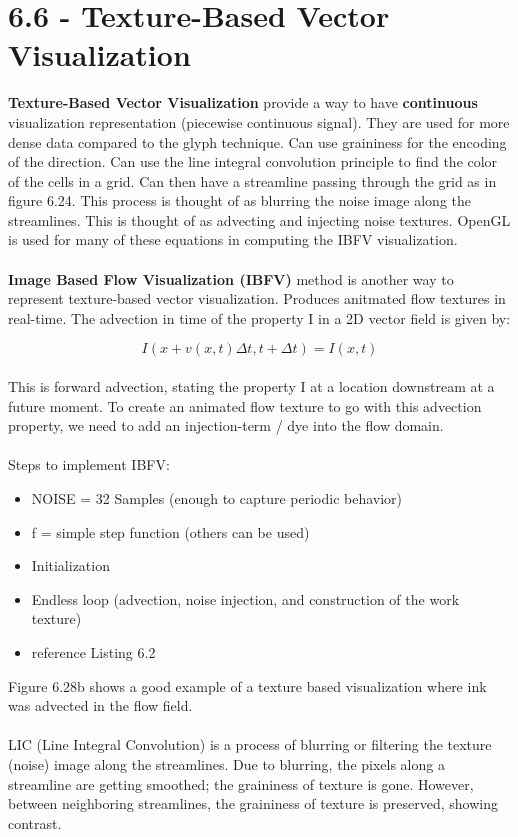 \documentclass{article}
\begin{document}
\section*{6.6 - Texture-Based Vector Visualization}
\textbf{ Texture-Based Vector Visualization} provide a way to have \textbf{continuous} visualization representation (piecewise continuous signal). They are used for more dense data compared to the glyph technique. Can use graininess for the encoding of the direction. Can use the line integral convolution principle to find the color of the cells in a grid. Can then have a streamline passing through the grid as in figure 6.24. This process is thought of as blurring the noise image along the streamlines. This is thought of as advecting and injecting noise textures. OpenGL is used for many of these equations in computing the IBFV visualization.
\\\\
\textbf{Image Based Flow Visualization (IBFV)} method is another way to represent texture-based vector visualization. Produces anitmated flow textures in real-time. The advection in time of the property I in a 2D vector field is given by:

\begin{equation}
    I(x+v(x,t)\Delta t, t+\Delta t) = I(x,t)
\end{equation}
\\
This is forward advection, stating the property I at a location downstream at a future moment. To create an animated flow texture to go with this advection property, we need to add an injection-term / dye into the flow domain. 
\\\\
Steps to implement IBFV:
\begin{itemize}
    \item NOISE = 32 Samples (enough to capture periodic behavior)
    \item f = simple step function (others can be used)
    \item Initialization
    \item Endless loop (advection, noise injection, and construction of the work texture)
    \item reference Listing 6.2
\end{itemize}
Figure 6.28b shows a good example of a texture based visualization where ink was advected in the flow field. 
\\\\
LIC (Line Integral Convolution) is a process of blurring or filtering the texture (noise) image along the streamlines. Due to blurring, the pixels along a streamline are getting smoothed; the graininess of texture is gone. However, between neighboring streamlines, the graininess of texture is preserved, showing contrast.
\end{document}

